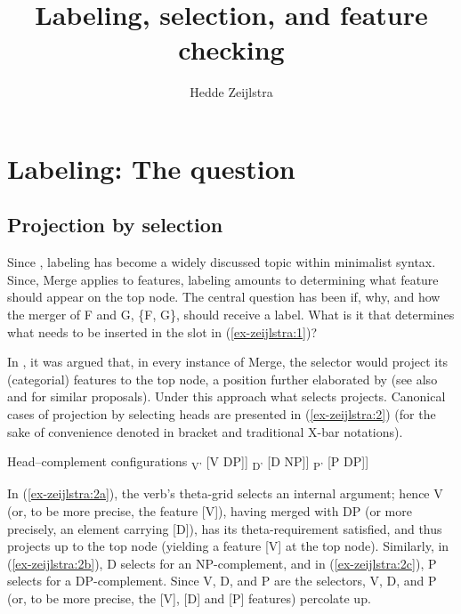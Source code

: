\documentclass[output=paper
,modfonts
,nonflat]{langsci/langscibook}
\title{Labeling, selection, and feature checking}
\author{Hedde Zeijlstra\affiliation{Georg-August-University Göttingen}}
\begin{document}
	\maketitle

\section{Labeling: The question}
\subsection{Projection by selection}
Since \citet{Chomsky1995}, labeling has become a widely discussed topic within minimalist syntax. Since, Merge applies to features, labeling amounts to determining what feature should appear on the top node. The central question has been if, why, and how the merger of F and G, \{F, G\}, should receive a label. What is it that determines what needs to be inserted in the \ul{} slot in (\ref{ex-zeijlstra:1})?

\begin{figure}[!h]
\begin{exe} 
\exbox{\label{ex-zeijlstra:1}
	\begin{forest}	
		[ \ul{}
		[F]
		[G] ]
	\end{forest}}
\end{exe} \vspace{-1.3cm}
\end{figure}
\newpage\noindent In \citet{Chomsky1995}, it was argued that, in every instance of Merge, the selector would project its (categorial) features to the top node, a position further elaborated by \citet{Adger2003} (see also \citealt{Boeckx2008} and \citealt{Cecchetto_Donati2010} for similar proposals). Under this approach what selects projects. Canonical cases of projection by selecting heads are presented in (\ref{ex-zeijlstra:2}) (for the sake of convenience denoted in bracket and traditional X-bar notations). 

\begin{exe}
\ex Head–complement configurations \label{ex-zeijlstra:2}
	\xlist
	\ex {[} \textsubscript{V'} {[}V DP{]}{]} \label{ex-zeijlstra:2a}
	\ex {[} \textsubscript{D'} {[}D NP{]}{]} \label{ex-zeijlstra:2b}
	\ex {[} \textsubscript{P'} {[}P DP{]}{]} \label{ex-zeijlstra:2c}
	\endxlist
\end{exe}
In (\ref{ex-zeijlstra:2a}), the verb’s theta-grid selects an internal argument; hence V (or, to be more precise, the feature {[}V{]}), having merged with DP (or more precisely, an element carrying [D]), has its theta-requirement satisfied, and thus projects up to the top node (yielding a feature {[}V{]} at the top node). Similarly, in (\ref{ex-zeijlstra:2b}), D selects for an NP-complement, and in (\ref{ex-zeijlstra:2c}), P selects for a DP-complement. Since V, D, and P are the selectors, V, D, and P (or, to be more precise, the {[}V{]}, {[}D{]} and {[}P{]} features) percolate up.
\end{document}
